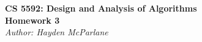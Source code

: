 \documentclass{article}
\newcommand\encircle[1]{
    \tikz[baseline=(X.base)]
        \node (X) [draw, shape=circle, inner sep=0]{\strut #1};
}
\begin{document}
\begin{titlepage}

    \begin{center}
        \large\textbf{CS 5592: Design and Analysis of Algorithms} \\        
        \large\textbf{Homework 3} \\        
        \large\textit{Author: Hayden McParlane}
    \end{center}

\end{titlepage}






\end{document}
